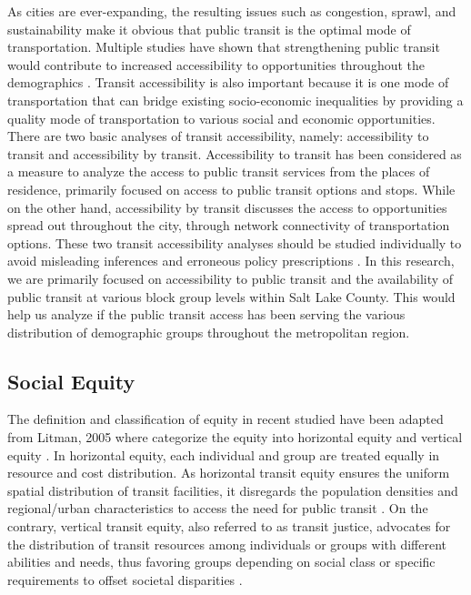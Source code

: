 \documentclass[numbered]{trbunofficial}
\begin{document}
As cities are ever-expanding, the resulting issues such as congestion, sprawl, and sustainability make it obvious that public transit is the optimal mode of transportation. Multiple studies have shown that strengthening public transit would contribute to increased accessibility to opportunities throughout the demographics \cite{Stern2020}. Transit accessibility is also important because it is one mode of transportation that can bridge existing socio-economic inequalities by providing a quality mode of transportation to various social and economic opportunities. There are two basic analyses of transit accessibility, namely: accessibility to transit and accessibility by transit. Accessibility to transit has been considered as a measure to analyze the access to public transit services from the places of residence, primarily focused on access to public transit options and stops. While on the other hand, accessibility by transit discusses the access to opportunities spread out throughout the city, through network connectivity of transportation options. These two transit accessibility analyses should be studied individually to avoid misleading inferences and erroneous policy prescriptions \cite{Moniruzzaman2012}. In this research, we are primarily focused on accessibility to public transit and the availability of public transit at various block group levels within Salt Lake County. This would help us analyze if the public transit access has been serving the various distribution of demographic groups throughout the metropolitan region.

\subsection{Social Equity}
The definition and classification of equity in recent studied have been adapted from Litman, 2005  where categorize the equity into horizontal equity and vertical equity \cite{Delbosc2011,Foth2013,Xavier2021}. In horizontal equity, each individual and group are treated equally in resource and cost distribution. As horizontal transit equity ensures the uniform spatial distribution of transit facilities, it disregards the population densities and regional/urban characteristics to access the need for public transit \cite{Foth2013}. On the contrary, vertical transit equity, also referred to as transit justice, advocates for the distribution of transit resources among individuals or groups with different abilities and needs, thus favoring groups depending on social class or specific requirements to offset societal disparities \cite{Delbosc2011}.
\end{document}
